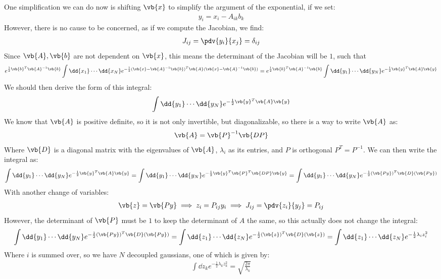 \documentclass[12pt]{article}
\def\A{\vb{A}}
\begin{document}
One simplification we can do now is shifting $\vb{x}$ to simplify the argument of the exponential, if we set:
\begin{align*}
  y_i=x_i-A_{ik}b_k
\end{align*}
However, there is no cause to be concerned, as if we compute the Jacobian, we find:
\begin{align*}
  J_{ij}=\pdv{y_i}{x_j}=\delta_{ij}
\end{align*}
Since $\A,\vb{b}$ are not dependent on $\vb{x}$, this means the determinant of the Jacobian will be $1$, such that
\begin{align*}
  e^{\frac12\vb{b}^T\A^{-1}\vb{b}}\int\dd{x_1}\cdots\dd{x_N}
  e^{-\frac12(\vb{x}-\A^{-1}\vb{b})^T\A(\vb{x}-\A^{-1}\vb{b})}
  =e^{\frac12\vb{b}^T\A^{-1}\vb{b}}\int\dd{y_1}\cdots\dd{y_N}
  e^{-\frac12\vb{y}^T\A\vb{y}}
\end{align*}
We should then derive the form of this integral:
\begin{align*}
  \int\dd{y_1}\cdots\dd{y_N}e^{-\frac12\vb{y}^T\A\vb{y}}
\end{align*}
We know that $\A$ is positive definite, so it is not only invertible, but diagonalizable, so there is a way to write $\A$ as:
\begin{align*}
  \A=\vb{P}^{-1}\vb{DP}
\end{align*}
Where $\vb{D}$ is a diagonal matrix with the eigenvalues of $\A$, $\lambda_i$ as its entries, and $P$ is orthogonal $P^T=P^{-1}$. We can then write the integral as:
\begin{align*}
  \int\dd{y_1}\cdots\dd{y_N}e^{-\frac12\vb{y}^T\A\vb{y}}=
  \int\dd{y_1}\cdots\dd{y_N}e^{-\frac12\vb{y}^T\vb{P}^T\vb{DP}\vb{y}}
  =\int\dd{y_1}\cdots\dd{y_N}e^{-\frac12(\vb{Py})^T\vb{D}(\vb{Py})}
\end{align*}
With another change of variables:
\begin{align*}
  \vb{z}=\vb{Py}\implies z_i=P_{ij}y_i\implies J_{ij}=\pdv{z_i}{y_j}=P_{ij}
\end{align*}
However, the determinant of $\vb{P}$ must be $1$ to keep the determinant of $A$ the same, so this actually does not change the integral:
\begin{align*}
  \int\dd{y_1}\cdots\dd{y_N}e^{-\frac12(\vb{Py})^T\vb{D}(\vb{Py})}
  =\int\dd{z_1}\cdots\dd{z_N}e^{-\frac12(\vb{z})^T\vb{D}(\vb{z})}
  =\int\dd{z_1}\cdots\dd{z_N}e^{-\frac12\lambda_iz_i^2}
\end{align*}
Where $i$ is summed over, so we have $N$ decoupled gaussians, one of which is given by:
\begin{align*}
  \int\dd{z_k}e^{-\frac12\lambda_kz_k^2}=\sqrt{\frac{2\pi}{\lambda_k}}
\end{align*}
\end{document}
